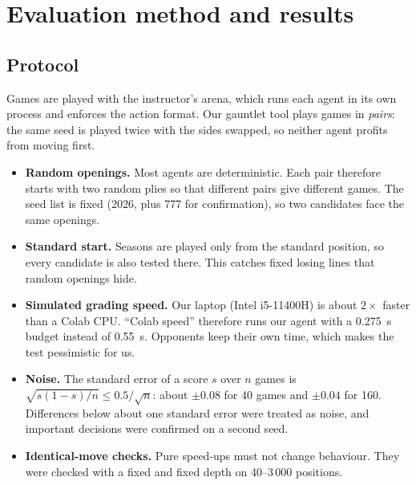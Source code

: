 \section{Evaluation method and results}
\label{sec:evaluation}

\subsection{Protocol}
\label{sec:protocol}
Games are played with the instructor's arena, which runs each agent in its own process and
enforces the action format. Our gauntlet tool plays games in \emph{pairs}: the same seed is
played twice with the sides swapped, so neither agent profits from moving first.
\begin{itemize}
  \item \textbf{Random openings.} Most agents are deterministic. Each pair therefore starts with
        two random plies so that different pairs give different games. The seed list is fixed
        (2026, plus 777 for confirmation), so two candidates face the same openings.
  \item \textbf{Standard start.} Seasons are played only from the standard position, so every
        candidate is also tested there. This catches fixed losing lines that random openings
        hide.
  \item \textbf{Simulated grading speed.} Our laptop (Intel i5-11400H) is about $2\times$ faster
        than a Colab CPU. ``Colab speed'' therefore runs our agent with a
        \SI{0.275}{\second} budget instead of \SI{0.55}{\second}. Opponents keep their own time,
        which makes the test pessimistic for us.
  \item \textbf{Noise.} The standard error of a score $s$ over $n$ games is
        $\sqrt{s(1-s)/n}\le 0.5/\sqrt{n}$: about $\pm0.08$ for 40 games and $\pm0.04$ for 160.
        Differences below about one standard error were treated as noise, and important
        decisions were confirmed on a second seed.
  \item \textbf{Identical-move checks.} Pure speed-ups must not change behaviour. They were
        checked with a fixed  and fixed depth on 40--3\,000 positions.
\end{itemize}

